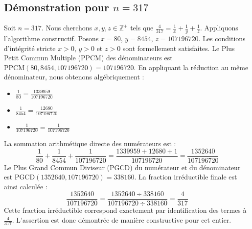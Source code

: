 \documentclass[11pt,a4paper]{article}
\begin{document}
\subsection{Démonstration pour $n = 317$}
Soit $n = 317$. Nous cherchons $x, y, z \in \mathbb{Z}^{+}$ tels que $\frac{4}{317} = \frac{1}{x} + \frac{1}{y} + \frac{1}{z}$.
Appliquons l'algorithme constructif. Posons $x = 80$, $y = 8454$, $z = 107196720$.
Les conditions d'intégrité stricte $x > 0$, $y > 0$ et $z > 0$ sont formellement satisfaites.
Le Plus Petit Commun Multiple (PPCM) des dénominateurs est $\text{PPCM}(80, 8454, 107196720) = 107196720$.
En appliquant la réduction au même dénominateur, nous obtenons algébriquement :
\begin{itemize}
    \item $\frac{1}{80} = \frac{1339959}{107196720}$
    \item $\frac{1}{8454} = \frac{12680}{107196720}$
    \item $\frac{1}{107196720} = \frac{1}{107196720}$
\end{itemize}
La sommation arithmétique directe des numérateurs est :
$$ \frac{1}{80} + \frac{1}{8454} + \frac{1}{107196720} = \frac{1339959 + 12680 + 1}{107196720} = \frac{1352640}{107196720} $$
Le Plus Grand Commun Diviseur (PGCD) du numérateur et du dénominateur est $\text{PGCD}(1352640, 107196720) = 338160$.
La fraction irréductible finale est ainsi calculée :
$$ \frac{1352640}{107196720} = \frac{1352640 \div 338160}{107196720 \div 338160} = \frac{4}{317} $$
Cette fraction irréductible correspond exactement par identification des termes à $\frac{4}{317}$. L'assertion est donc démontrée de manière constructive pour cet entier.
\end{document}

